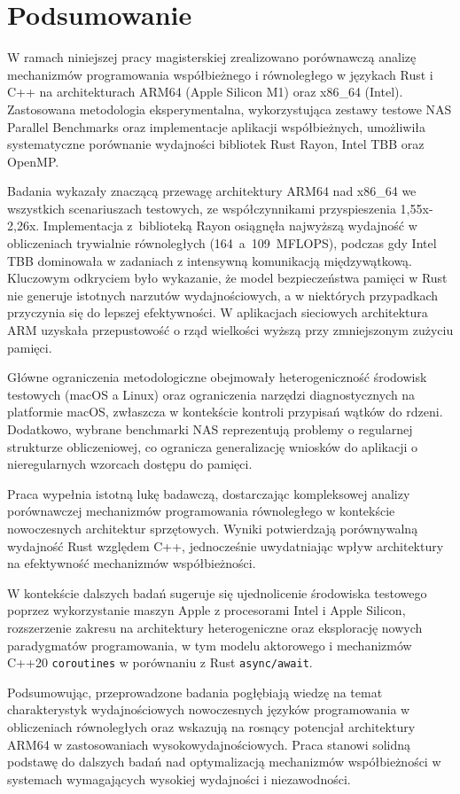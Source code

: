 \chapter{Podsumowanie}
W ramach niniejszej pracy magisterskiej zrealizowano porównawczą analizę mechanizmów programowania współbieżnego i równoległego w językach Rust i C++ na architekturach ARM64 (Apple Silicon M1) oraz x86\_64 (Intel). Zastosowana metodologia eksperymentalna, wykorzystująca zestawy testowe NAS Parallel Benchmarks oraz implementacje aplikacji współbieżnych, umożliwiła systematyczne porównanie wydajności bibliotek Rust Rayon, Intel TBB oraz OpenMP.

Badania wykazały znaczącą przewagę architektury ARM64 nad x86\_64 we wszystkich scenariuszach testowych, ze współczynnikami przyspieszenia 1,55x-2,26x. Implementacja z~biblioteką Rayon osiągnęła najwyższą wydajność w obliczeniach trywialnie równoległych \mbox{(164 a 109 MFLOPS)}, podczas gdy Intel TBB dominowała w zadaniach z intensywną komunikacją międzywątkową. Kluczowym odkryciem było wykazanie, że model bezpieczeństwa pamięci w Rust nie generuje istotnych narzutów wydajnościowych, a w niektórych przypadkach przyczynia się do lepszej efektywności. W aplikacjach sieciowych architektura ARM uzyskała przepustowość o rząd wielkości wyższą przy zmniejszonym zużyciu pamięci.

Główne ograniczenia metodologiczne obejmowały heterogeniczność środowisk testowych (macOS a Linux) oraz ograniczenia narzędzi diagnostycznych na platformie macOS, zwłaszcza w kontekście kontroli przypisań wątków do rdzeni. Dodatkowo, wybrane benchmarki NAS reprezentują problemy o regularnej strukturze obliczeniowej, co ogranicza generalizację wniosków do aplikacji o nieregularnych wzorcach dostępu do pamięci.

Praca wypełnia istotną lukę badawczą, dostarczając kompleksowej analizy porównawczej mechanizmów programowania równoległego w kontekście nowoczesnych architektur sprzętowych. Wyniki potwierdzają porównywalną wydajność Rust względem C++, jednocześnie uwydatniając wpływ architektury na efektywność mechanizmów współbieżności.

W kontekście dalszych badań sugeruje się ujednolicenie środowiska testowego poprzez wykorzystanie maszyn Apple z procesorami Intel i Apple Silicon, rozszerzenie zakresu na architektury heterogeniczne oraz eksplorację nowych paradygmatów programowania, w tym modelu aktorowego i mechanizmów C++20 \texttt{coroutines} w porównaniu z Rust \texttt{async/await}.

Podsumowując, przeprowadzone badania pogłębiają wiedzę na temat charakterystyk wydajnościowych nowoczesnych języków programowania w obliczeniach równoległych oraz wskazują na rosnący potencjał architektury ARM64 w zastosowaniach wysokowydajnościowych. Praca stanowi solidną podstawę do dalszych badań nad optymalizacją mechanizmów współbieżności w systemach wymagających wysokiej wydajności i niezawodności.
